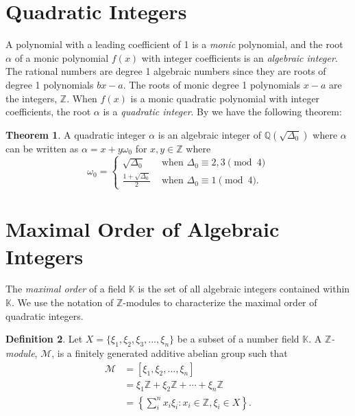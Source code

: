 \documentclass{ucalgthes1}
\theoremstyle{definition}
\newtheorem{thm}{Theorem}[section]
\newtheorem{defn}[thm]{Definition}
\newcommand{\KK}{\mathbb{K}}
\newcommand{\MM}{\mathcal{M}}
\newcommand{\ZZ}{\mathbb{Z}}
\newcommand{\QQ}{\mathbb{Q}}
\begin{document}
\bigbreak
\section{Quadratic Integers}

A polynomial with a leading coefficient of 1 is a \emph{monic} polynomial, and the root $\alpha$ of a monic polynomial $f(x)$ with integer coefficients is an \emph{algebraic integer}. The rational numbers are degree 1 algebraic numbers since they are roots of degree 1 polynomials $bx-a$.  The roots of monic degree 1 polynomials $x-a$ are the integers, $\ZZ$.  When $f(x)$ is a monic quadratic polynomial with integer coefficients, the root $\alpha$ is a \emph{quadratic integer}. By \cite[p.77]{Jacobson2009} we have the following theorem:

\begin{thm}
A quadratic integer $\alpha$ is an algebraic integer of $\QQ(\sqrt{\Delta_0})$ where $\alpha$ can be written as $\alpha = x + y \omega_0$ for $x, y \in \ZZ$ where
\begin{equation*}
	\omega_0 = \begin{cases}
		\sqrt{\Delta_0} & \textrm{ when } \Delta_0 \equiv 2, 3 \pmod 4 \\
		\frac{1+\sqrt{\Delta_0}}{2} & \textrm{ when } \Delta_0 \equiv 1 \pmod 4.
	\end{cases}
\end{equation*}
\end{thm}


\bigbreak
\section{Maximal Order of Algebraic Integers}

The \emph{maximal order} of a field $\KK$ is the set of all algebraic integers contained within $\KK$.  We use the notation of $\ZZ$-modules to characterize the maximal order of quadratic integers.


\begin{defn}
Let $X = \{ \xi_1, \xi_2, \xi_3, ..., \xi_n \}$ be a subset of a number field $\KK$.  A \emph{$\ZZ$\mbox{-}module}, $\MM$, is a finitely generated additive abelian group such that
\begin{align*}
	\MM &= [ \xi_1, \xi_2, ..., \xi_n ] \\
	& =  \xi_1 \ZZ + \xi_2 \ZZ + \cdots + \xi_n \ZZ \\
	& = \left \{ \sum_{i}^n x_i \xi_i : x_i \in \ZZ, \xi_i \in X \right \}.
\end{align*}
\end{defn}
\end{document}
